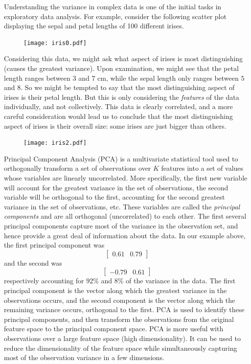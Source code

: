 
Understanding the variance in complex data is one of the initial tasks in exploratory data analysis. For example, consider the following scatter plot displaying the sepal and petal lengths of 100 different irises.
\begin{figure}[h]
\centering
\texttt{[image: iris0.pdf]}
\end{figure}
Considering this data, we might ask what aspect of irises is most distinguishing (causes the greatest variance). Upon examination, we might see that the petal length ranges between $3$ and $7$ cm, while the sepal length only ranges between $5$ and $8$. So we might be tempted to say that the most distinguishing aspect of irises is their petal length.
But this is only considering the \emph{features} of the data individually, and not collectively. This data is clearly correlated, and a more careful consideration would lead us to conclude that the most distinguishing aspect of irises is their overall size: some irises are just bigger than others.
\begin{figure}[h]
\centering
\texttt{[image: iris2.pdf]}
\end{figure}

Principal Component Analysis (PCA) is a multivariate statistical tool used to orthogonally transform a set of observations over $K$ features into a set of values whose variables are linearly uncorrelated. More specifically, the first new variable will account for the greatest variance in the set of observations, the second variable will be orthogonal to the first, accounting for the second greatest variance in the set of observations, etc. These variables are called the \emph{principal components} and are all orthogonal (uncorrelated) to each other. The first several principal components capture most of the variance in the observation set, and hence provide a great deal of information about the data.
In our example above, the first principal component was \[\left[ \begin{array}{cc} 0.61 & 0.79 \end{array} \right] \]  and the second was \[\left[ \begin{array}{cc} -0.79 & 0.61 \end{array} \right] \] respectively accounting for $92\%$ and $8\%$ of the variance in the data. The first principal component is the vector along which the greatest variance in the observations occurs, and the second component is the vector along which the remaining variance occurs, orthogonal to the first. PCA is used to identify these principal components, and then transform the observations from the original feature space to the principal component space.
PCA is more useful with observations over a large feature space (high dimensionality). It can be used to reduce the dimensionality of the feature space while simultaneously capturing most of the observation variance in a few dimensions.


